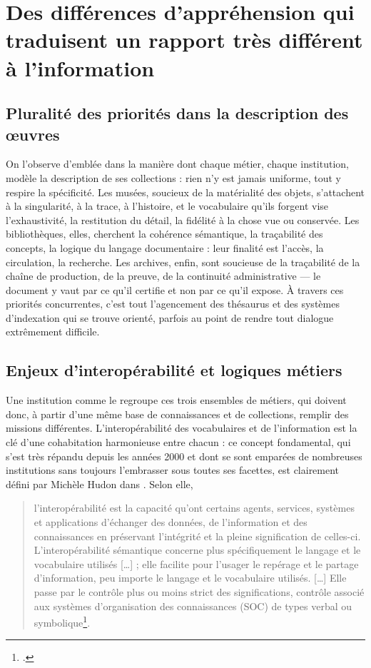 \section{\label{II-B-2}Des différences d’appréhension qui traduisent un rapport très différent à l’information}


\subsection{Pluralité des priorités dans la description des œuvres}

On l’observe d’emblée dans la manière dont chaque métier, chaque institution, modèle la description de ses collections : rien n’y est jamais uniforme, tout y respire la spécificité. Les musées, soucieux de la matérialité des objets, s’attachent à la singularité, à la trace, à l’histoire, et le vocabulaire qu’ils forgent vise l’exhaustivité, la restitution du détail, la fidélité à la chose vue ou conservée. Les bibliothèques, elles, cherchent la cohérence sémantique, la traçabilité des concepts, la logique du langage documentaire : leur finalité est l’accès, la circulation, la recherche. Les archives, enfin, sont soucieuse de la traçabilité de la chaîne de production, de la preuve, de la continuité administrative — le document y vaut par ce qu’il certifie et non par ce qu’il expose. À travers ces priorités concurrentes, c’est tout l’agencement des thésaurus et des systèmes d’indexation qui se trouve orienté, parfois au point de rendre tout dialogue extrêmement difficile.

\subsection{Enjeux d’interopérabilité et logiques métiers}

Une institution comme le \mae regroupe ces trois ensembles de métiers, qui doivent donc, à partir d'une même base de connaissances et de collections, remplir des missions différentes. L’interopérabilité des vocabulaires et de l'information est la clé d'une cohabitation harmonieuse entre chacun : ce concept fondamental, qui s'est très répandu depuis les années 2000 et dont se sont emparées de nombreuses institutions sans toujours l'embrasser sous toutes ses facettes, est clairement défini par Michèle Hudon dans . Selon elle, 
\begin{quote}
	l’interopérabilité est la capacité qu’ont certains agents, services, systèmes et applications d’échanger des données, de l’information et des connaissances en préservant l’intégrité et la pleine signification de celles-ci. L’interopérabilité sémantique concerne plus spécifiquement le langage et le vocabulaire utilisés […] ; elle facilite pour l’usager le repérage et le partage d’information, peu importe le langage et le vocabulaire utilisés. […] Elle passe par le contrôle plus ou moins strict des significations, contrôle associé aux systèmes d’organisation des connaissances (SOC) de types verbal ou symbolique\footcite{hudonISO25964Pour2012a}.
\end{quote}

